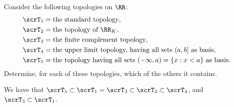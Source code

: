 \documentclass{article}
\begin{document}
\begin{exercise}
    Consider the following topologies on $\RR$:
    \begin{align*}
        \scrT_1 &= \text{the standard topology}, \\
        \scrT_2 &= \text{the topology of }\RR_K, \\
        \scrT_3 &= \text{the finite complement topology}, \\
        \scrT_4 &= \text{the upper limit topology, having all sets }(a,b]\text{ as basis}, \\
        \scrT_5 &= \text{the topology having all sets }(-\infty,a)=\{x:x<a\}\text{ as basis}.
    \end{align*}
    Determine, for each of these topologies, which of the others it contains.
\end{exercise}

We have that $\scrT_5 \subset \scrT_1 = \scrT_3 \subset \scrT_2 \subset \scrT_4$, and  $\scrT_3 \subset \scrT_1$.
\end{document}
